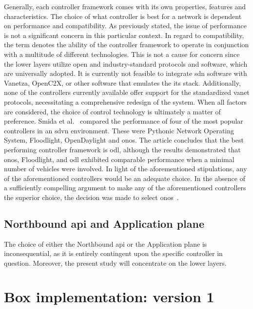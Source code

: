 Generally, each controller framework comes with its own properties, features and characteristics. The choice of what controller is best for a network is dependent on performance and compatibility.  As previously stated, the issue of performance is not a significant concern in this particular context. In regard to compatibility, the term denotes the ability of the controller framework to operate in conjunction with a multitude of different technologies. This is not a cause for concern since the lower layers utilize open and industry-standard protocols and software, which are universally adopted.
It is currently not feasible to integrate \gls{sdn} software with Vanetza, OpenC2X, or other software that emulates the \gls{its} stack. Additionally, none of the controllers currently available offer support for the standardized \gls{vanet} protocols, necessitating a comprehensive redesign of the system.
When all factors are considered, the choice of control technology is ultimately a matter of preference. Smida et al.~\cite{smida_efficient_2020} compared the performance of four of the most popular controllers in an \gls{sdvn} environment. These were Pythonic Network Operating System, Floodlight, OpenDaylight and \gls{onos}. The article concludes that the best performing controller framework is \gls{odl}, although the results demonstrated that \gls{onos}, Floodlight, and \gls{odl} exhibited comparable performance when a minimal number of vehicles were involved. In light of the aforementioned stipulations, any of the aforementioned controllers would be an adequate choice. In the absence of a sufficiently compelling argument to make any of the aforementioned controllers the superior choice, the decision was made to select \gls{onos}~\cite{noauthor_opennetworkinglabonos_nodate}.


\subsection[Northbound API and Application plane]{Northbound \gls{api} and Application plane}

The choice of either the Northbound \gls{api} or the Application plane is inconsequential, as it is entirely contingent upon the specific controller in question. Moreover, the present study will concentrate on the lower layers.

\section{Box implementation: version 1}
\label{sec:box_v1}


